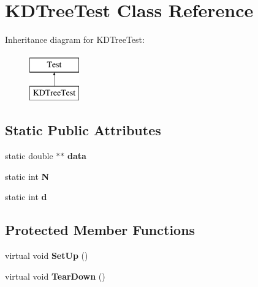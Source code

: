\hypertarget{classKDTreeTest}{\section{K\-D\-Tree\-Test Class Reference}
\label{classKDTreeTest}
}
Inheritance diagram for K\-D\-Tree\-Test\-:\begin{figure}[H]
\begin{center}
\leavevmode
\includegraphics[height=2.000000cm]{classKDTreeTest}
\end{center}
\end{figure}
\subsection*{Static Public Attributes}
\begin{DoxyCompactItemize}
\item 
\hypertarget{classKDTreeTest_aaac1a9c917141d1867a9beea70b93cb1}{static double $\ast$$\ast$ {\bfseries data}}\label{classKDTreeTest_aaac1a9c917141d1867a9beea70b93cb1}

\item 
\hypertarget{classKDTreeTest_af1ae68702af5f8326e91dd726934c1d9}{static int {\bfseries N}}\label{classKDTreeTest_af1ae68702af5f8326e91dd726934c1d9}

\item 
\hypertarget{classKDTreeTest_ab036748f3456e0b07003aa3f538ad80b}{static int {\bfseries d}}\label{classKDTreeTest_ab036748f3456e0b07003aa3f538ad80b}

\end{DoxyCompactItemize}
\subsection*{Protected Member Functions}
\begin{DoxyCompactItemize}
\item 
\hypertarget{classKDTreeTest_ae64f932fe7a552a1977397f5884e4696}{virtual void {\bfseries Set\-Up} ()}\label{classKDTreeTest_ae64f932fe7a552a1977397f5884e4696}

\item 
\hypertarget{classKDTreeTest_af827d1df2c003a2ae4e755ae2cc83703}{virtual void {\bfseries Tear\-Down} ()}\label{classKDTreeTest_af827d1df2c003a2ae4e755ae2cc83703}

\end{DoxyCompactItemize}
